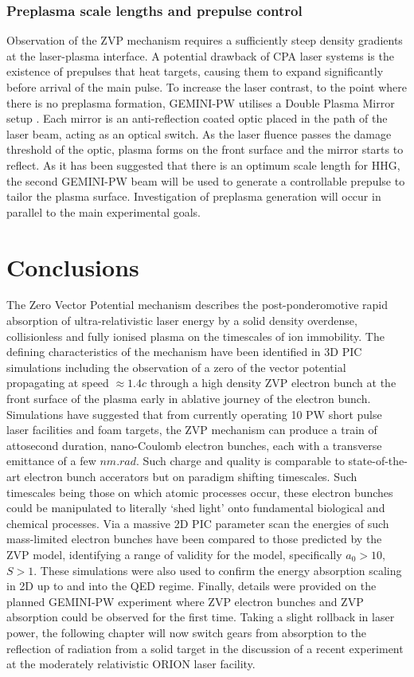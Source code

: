 \subsubsection{Preplasma scale lengths and prepulse control}
Observation of the ZVP mechanism requires a sufficiently steep density gradients at the laser-plasma interface. A potential drawback of \ac{CPA} laser systems is the existence of prepulses that heat targets, causing them to expand significantly before arrival of the main pulse. To increase the laser contrast, to the point where there is no preplasma formation, GEMINI-PW utilises a Double Plasma Mirror setup \cite{doumyCompleteCharacterizationPlasma2004}. Each mirror is an anti-reflection coated optic placed in the path of the laser beam, acting as an optical switch. As the laser fluence passes the damage threshold of the optic, plasma forms on the front surface and the mirror starts to reflect. As it has been suggested that there is an optimum scale length for \ac{HHG}, the second GEMINI-PW beam will be used to generate a controllable prepulse to tailor the plasma surface. Investigation of preplasma generation will occur in parallel to the main experimental goals.

\section{Conclusions}\label{sec:zvp-conclusion}
The Zero Vector Potential mechanism describes the post-ponderomotive rapid absorption of ultra-relativistic laser energy by a solid density overdense, collisionless and fully ionised plasma on the timescales of ion immobility. The defining characteristics of the mechanism have been identified in 3D PIC simulations including the observation of a zero of the vector potential propagating at speed $\approx 1.4c$ through a high density ZVP electron bunch at the front surface of the plasma early in ablative journey of the electron bunch. Simulations have suggested that from currently operating 10 PW short pulse laser facilities and foam targets, the ZVP mechanism can produce a train of attosecond duration, nano-Coulomb electron bunches, each with a transverse emittance of a few $\unit{nm.rad}$. Such charge and quality is comparable to state-of-the-art electron bunch accerators but on paradigm shifting timescales. Such timescales being those on which atomic processes occur, these electron bunches could be manipulated to literally `shed light' onto fundamental biological and chemical processes. Via a massive 2D PIC parameter scan the energies of such mass-limited electron bunches have been compared to those predicted by the ZVP model, identifying a range of validity for the model, specifically $a_0>10$, $S>1$. These simulations were also used to confirm the energy absorption scaling in 2D up to and into the QED regime. Finally, details were provided on the planned GEMINI-PW experiment where ZVP electron bunches and ZVP absorption could be observed for the first time. Taking a slight rollback in laser power, the following chapter will now switch gears from absorption to the reflection of radiation from a solid target in the discussion of a recent experiment at the moderately relativistic ORION laser facility.